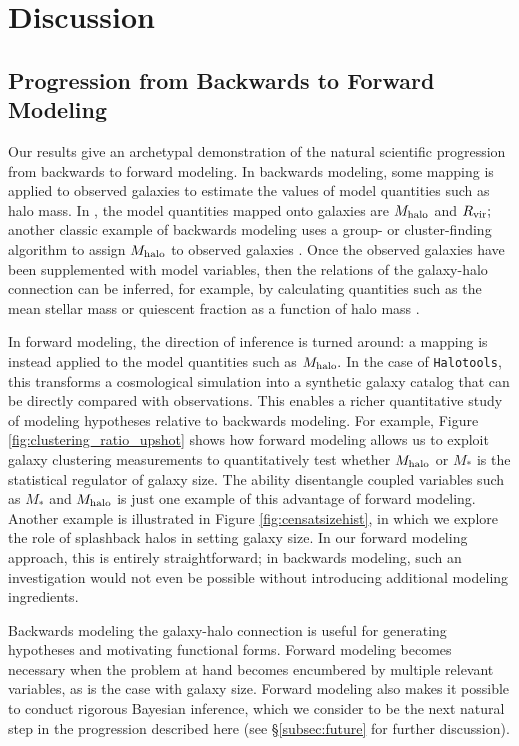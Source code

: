 \documentclass[usenatbib,usegraphicx,letterpaper]{mn2e}
\newcommand{\mstar}{M_{\ast}}
\newcommand{\mhalo}{M_{\rm halo}}
\newcommand{\rvir}{R_{\rm vir}}
\begin{document}
\section{Discussion}
\label{sec:discussion}

\subsection{Progression from Backwards to Forward Modeling}
\label{subsec:forwardsmodeling}

Our results give an archetypal demonstration of the natural scientific progression from backwards to forward modeling. In backwards modeling, some mapping is applied to observed galaxies to estimate the values of model quantities such as halo mass. In \citet{kravtsov13}, the model quantities mapped onto galaxies are $\mhalo$ and $\rvir;$ another classic example of backwards modeling uses a group- or cluster-finding algorithm to assign $\mhalo$ to observed galaxies \citep[e.g.,][]{berlind_etal06,yang_etal05a,rykoff_etal14}. Once the observed galaxies have been supplemented with model variables, then the relations of the galaxy-halo connection can be inferred, for example, by calculating quantities such as the mean stellar mass or quiescent fraction as a function of halo mass \citep[e.g.,][]{yang_etal05b,weinmann_etal06}.

In forward modeling, the direction of inference is turned around: a mapping is instead applied to the model quantities such as $\mhalo.$ In the case of {\tt Halotools}, this transforms a cosmological simulation into a synthetic galaxy catalog that can be directly compared with observations. This enables a richer quantitative study of modeling hypotheses relative to backwards modeling. For example, Figure \ref{fig:clustering_ratio_upshot} shows how forward modeling allows us to exploit galaxy clustering measurements to quantitatively test whether $\mhalo$ or $\mstar$ is the statistical regulator of galaxy size. The ability disentangle coupled variables such as $\mstar$ and $\mhalo$ is just one example of this advantage of forward modeling. Another example is illustrated in Figure \ref{fig:censatsizehist}, in which we explore the role of splashback halos in setting galaxy size. In our forward modeling approach, this is entirely straightforward; in backwards modeling, such an investigation would not even be possible without introducing additional modeling ingredients.

Backwards modeling the galaxy-halo connection is useful for generating hypotheses and motivating functional forms. Forward modeling becomes necessary when the problem at hand becomes encumbered by multiple relevant variables, as is the case with galaxy size. Forward modeling also makes it possible to conduct rigorous Bayesian inference, which we consider to be the next natural step in the progression described here (see \S\ref{subsec:future} for further discussion).
\end{document}
